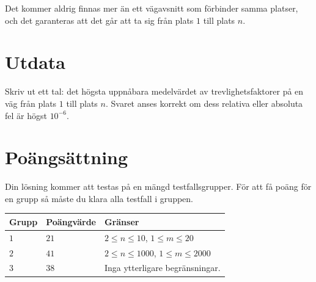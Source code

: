 Det kommer aldrig finnas mer än ett vägavsnitt som förbinder samma platser, och det garanteras
att det går att ta sig från plats $1$ till plats $n$.

\section*{Utdata}
Skriv ut ett tal: det högsta uppnåbara medelvärdet av trevlighetsfaktorer på en väg från plats $1$ till plats $n$.
Svaret anses korrekt om dess relativa eller absoluta fel är högst $10^{-6}$.

\section*{Poängsättning}
Din lösning kommer att testas på en mängd testfallsgrupper. För att få poäng för en grupp så måste du klara alla testfall i gruppen.

\noindent
\begin{tabular}{| l | l | p{12cm} |}
  \hline
  Grupp & Poängvärde & Gränser \\ \hline
  $1$   & $21$       & $2 \le n \le 10$, $1 \le m \le 20$ \\ \hline
  $2$   & $41$       & $2 \le n \le 1000$, $1 \le m \le 2000$\\ \hline
  $3$   & $38$       & Inga ytterligare begränsningar. \\ \hline
\end{tabular}